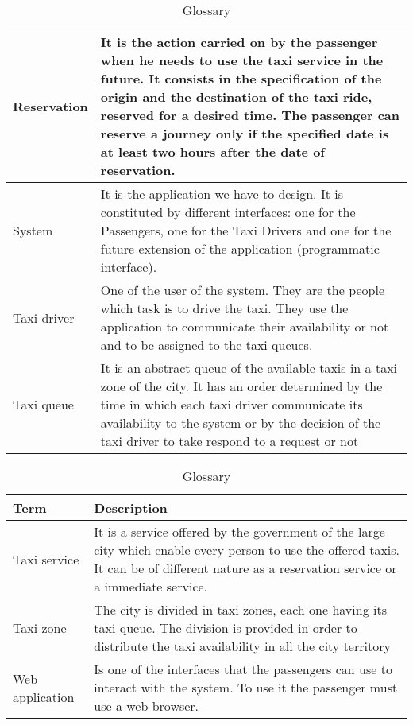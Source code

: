 \begin{table}[]
\begin{tabularx}{\textwidth}{|l|X|}
Reservation & It is the action carried on by the passenger when he needs to use the taxi service in the future. It consists in the specification of the origin and the destination of the taxi ride, reserved for a desired time. The passenger can reserve a journey only if the specified date is at least two hours after the date of reservation. \\ \hline
System & It is the application we have to design. It is constituted by different interfaces: one for the Passengers, one for the Taxi Drivers and one for the future extension of the application (programmatic interface). \\ \hline
Taxi driver & One of the user of the system. They are the people which task is to drive the taxi. They use the application to communicate their availability or not and to be assigned to the taxi queues. \\ \hline
Taxi queue & It is an abstract queue of the available taxis in a taxi zone of the city. It has an order determined by the time in which each taxi driver communicate its availability to the system or by the decision of the taxi driver to take respond to a request or not \\ \hline
\end{tabularx}
\caption{Glossary}
\label{glossary1}
\end{table}

\begin{table}
\centering
\begin{tabularx}{\textwidth}{|l|X|} \hline
{\Large \textbf{Term}} & {\Large \textbf{Description}} \\ \hline
Taxi service & It is a service offered by the government of the large city which enable every person to use the offered taxis. It can be of different nature as a reservation service or a immediate service. \\ \hline
Taxi zone & The city is divided in taxi zones, each one having its taxi queue. The division is provided in order to distribute the taxi availability in all the city territory \\ \hline
Web application & Is one of the interfaces that the passengers can use to interact with the system. To use it the passenger must use a web browser. \\ \hline
\end{tabularx}
\caption{Glossary}
\label{glossary2}
\end{table}